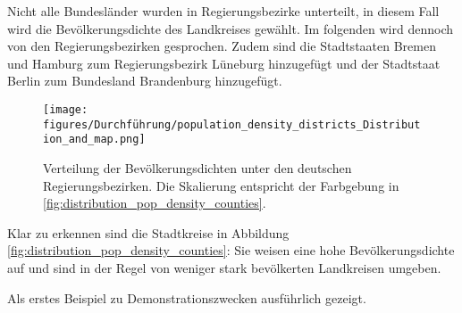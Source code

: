 Nicht alle Bundesländer wurden in Regierungsbezirke unterteilt, in diesem Fall wird die Bevölkerungsdichte des Landkreises gewählt. Im folgenden wird dennoch von \glqq{}den Regierungsbezirken\grqq{} gesprochen. Zudem sind die Stadtstaaten Bremen und Hamburg zum Regierungsbezirk Lüneburg hinzugefügt und der Stadtstaat Berlin zum Bundesland Brandenburg hinzugefügt.

\begin{figure}[H]
    \centering
    \texttt{[image: figures/Durchführung/population\_density\_districts\_Distribution\_and\_map.png]}
    \caption{Verteilung der Bevölkerungsdichten unter den deutschen Regierungsbezirken. Die Skalierung entspricht der Farbgebung in \autoref{fig:distribution_pop_density_counties}.}
    \label{fig:distribution_pop_density_districts}
\end{figure}

Klar zu erkennen sind die Stadtkreise in Abbildung \ref{fig:distribution_pop_density_counties}: Sie weisen eine hohe Bevölkerungsdichte auf und sind in der Regel von weniger stark bevölkerten Landkreisen umgeben.

Als erstes Beispiel zu Demonstrationszwecken ausführlich gezeigt.

